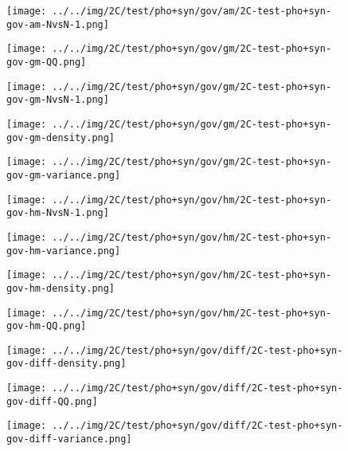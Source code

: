 \begin{figure}[H]
\centering	\texttt{[image: ../../img/2C/test/pho+syn/gov/am/2C-test-pho+syn-gov-am-NvsN-1.png]}
\end{figure}
\begin{figure}[H]
\centering	\texttt{[image: ../../img/2C/test/pho+syn/gov/gm/2C-test-pho+syn-gov-gm-QQ.png]}
\end{figure}
\begin{figure}[H]
\centering	\texttt{[image: ../../img/2C/test/pho+syn/gov/gm/2C-test-pho+syn-gov-gm-NvsN-1.png]}
\end{figure}
\begin{figure}[H]
\centering	\texttt{[image: ../../img/2C/test/pho+syn/gov/gm/2C-test-pho+syn-gov-gm-density.png]}
\end{figure}
\begin{figure}[H]
\centering	\texttt{[image: ../../img/2C/test/pho+syn/gov/gm/2C-test-pho+syn-gov-gm-variance.png]}
\end{figure}
\begin{figure}[H]
\centering	\texttt{[image: ../../img/2C/test/pho+syn/gov/hm/2C-test-pho+syn-gov-hm-NvsN-1.png]}
\end{figure}
\begin{figure}[H]
\centering	\texttt{[image: ../../img/2C/test/pho+syn/gov/hm/2C-test-pho+syn-gov-hm-variance.png]}
\end{figure}
\begin{figure}[H]
\centering	\texttt{[image: ../../img/2C/test/pho+syn/gov/hm/2C-test-pho+syn-gov-hm-density.png]}
\end{figure}
\begin{figure}[H]
\centering	\texttt{[image: ../../img/2C/test/pho+syn/gov/hm/2C-test-pho+syn-gov-hm-QQ.png]}
\end{figure}
\begin{figure}[H]
\centering	\texttt{[image: ../../img/2C/test/pho+syn/gov/diff/2C-test-pho+syn-gov-diff-density.png]}
\end{figure}
\begin{figure}[H]
\centering	\texttt{[image: ../../img/2C/test/pho+syn/gov/diff/2C-test-pho+syn-gov-diff-QQ.png]}
\end{figure}
\begin{figure}[H]
\centering	\texttt{[image: ../../img/2C/test/pho+syn/gov/diff/2C-test-pho+syn-gov-diff-variance.png]}
\end{figure}
